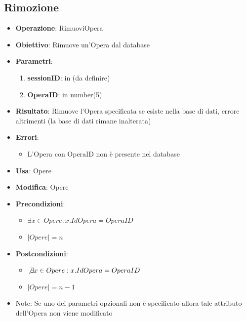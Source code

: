 \documentclass[a4paper,11pt]{article}
\begin{document}
\subsection{Rimozione}
\begin{itemize}
	\item \textbf{Operazione}: RimuoviOpera
	\item \textbf{Obiettivo}: Rimuove un'Opera dal database
	\item \textbf{Parametri}:
	\begin{enumerate}
		\item \textbf{sessionID}: in (da definire)
		\item \textbf{OperaID}: in number(5)
	\end{enumerate}
	\item \textbf{Risultato}: Rimuove l'Opera specificata se esiste nella base di dati, errore altrimenti (la base di dati rimane inalterata)
	\item \textbf{Errori}: 
	\begin{itemize}
		\item L'Opera con OperaID non è presente nel database
	\end{itemize}
	\item \textbf{Usa}: Opere
	\item \textbf{Modifica}: Opere
	\item \textbf{Precondizioni}:
	\begin{itemize}
		\item $\exists x \in Opere : x.IdOpera = OperaID$
		\item $|Opere| = n$
	\end{itemize}
	\item \textbf{Postcondizioni}:
	\begin{itemize}
		\item $\not\exists x \in Opere : x.IdOpera = OperaID$
		\item $|Opere| = n - 1$
	\end{itemize}
	\item Note: Se uno dei parametri opzionali non è specificato allora tale attributo 
	dell'Opera non viene modificato
\end{itemize}

\end{document}
